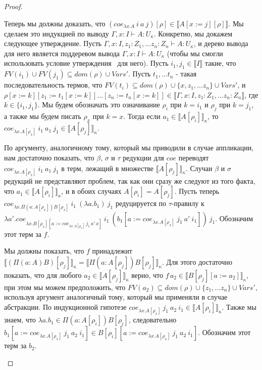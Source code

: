 \documentclass{amsart}
\theoremstyle{definition}
\theoremstyle{remark}
\renewcommand{\ll}{\llbracket}
\newcommand{\rr}{\rrbracket}
\numberwithin{figure}{section}
\begin{document}
\begin{proof}
\begin{itemize}
Теперь мы должны доказать, что $(coe_{\lambda x. A}\ i\ a\ j)[\rho] \in \ll A[x := j][\rho] \rr$.
Мы сделаем это индукцией по выводу $\Gamma, x : I \vdash A : U_\kappa$.
Конкретно, мы докажем следующее утверждение.
Пусть $\Gamma, x : I, z_1 : Z_1, \ldots z_n : Z_n \vdash A : U_\kappa$, и дерево вывода для него является поддеревом вывода
    $\Gamma, x : I \vdash A : U_\kappa$ (чтобы мы смогли использовать условие утверждения~ для него).
Пусть $i_1, j_1 \in \ll I \rr$ такие, что $FV(i_1) \cup FV(j_1) \subseteq dom(\rho) \cup Vars'$.
Пусть $t_1, \ldots t_n$ - такая последовательность термов, что $FV(t_i) \subseteq dom(\rho) \cup \{ x, z_1, \ldots z_n \} \cup Vars'$, и
$\rho[x := k][z_1 := t_1[x := k]] \ldots [z_n := t_n[x := k]] \in \ll \Gamma, x : I, z_1 : Z_1, \ldots z_n : Z_n \rr$, где $k \in \{ i_1, j_1 \}$.
Мы будем обозначать это означивание $\rho_i$ при $k = i_1$ и $\rho_j$ при $k = j_1$, а также мы будем писать $\rho_x$ при $k = x$.
Тогда если $a_1 \in \ll A[\rho_i] \rr_\kappa$, то $coe_{\lambda x. A[\rho_x]}\ i_1\ a_1\ j_1 \in \ll A[\rho_j] \rr_\kappa$.

По аргументу, аналогичному тому, который мы приводили в случае аппликации, нам достаточно показать,
    что $\beta$, $\sigma$ и $\tau$ редукции для $coe$ переводят $coe_{\lambda x. A[\rho_x]}\ i_1\ a_1\ j_1$ в терм, лежащий в множестве $\ll A[\rho_j] \rr_\kappa$.
Случаи $\beta$ и $\sigma$ редукций не представляют проблем, так как они сразу же следуют из того факта, что $a_1 \in \ll A[\rho_i] \rr_\kappa$, и в обоих случаях $A[\rho_i] = A[\rho_j]$.
Пусть теперь $coe_{\lambda x. \Pi (a : A[\rho_x]) B[\rho_x]}\ i_1\ (\lambda a. b_1)\ j_1$ редуцируется по $\tau$-правилу к
    $\lambda a'. coe_{\lambda x. B[\rho_x][a := coe_{\lambda x. A[\rho_x]}\,j_1\,a'\,x]}\ i_1\ (b_1[a := coe_{\lambda x. A[\rho_x]}\ j_1\ a'\ i_1])\ j_1$.
Обозначим этот терм за $f$.

Мы должны показать, что $f$ принадлежит $\ll (\Pi (a : A) B)[\rho_j] \rr_\kappa = \ll \Pi (a : A[\rho_j]) B[\rho_j]\rr_\kappa$.
Для этого достаточно показать, что для любого $a_2 \in \ll A[\rho_j] \rr_\kappa$ верно, что $f\,a_2 \in \ll B[\rho_j][a := a_2] \rr_\kappa$,
    при этом мы можем предположить, что $FV(a_2) \subseteq dom(\rho) \cup \{ z_1, \ldots z_n \} \cup Vars'$, используя аргумент аналогичный тому, который мы применяли в случае абстракции.
По индукционной гипотезе $coe_{\lambda x. A[\rho_x]}\ j_1\ a_2\ i_1 \in \ll A[\rho_i] \rr_\kappa$.
Также мы знаем, что $\lambda a. b_1 \in \Pi (a : A[\rho_i]) B[\rho_i]$,
    следовательно $b_1[a := coe_{\lambda x. A[\rho_x]}\ j_1\ a_2\ i_1] \in B[\rho_i][a := coe_{\lambda x. A[\rho_x]}\ j_1\ a_2\ i_1]$.
Обозначим этот терм за $b_2$.


\end{itemize}
\end{proof}
\end{document}
